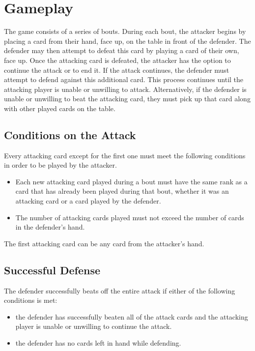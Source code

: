 \section{Gameplay}
The game consists of a series of bouts. During each bout, the attacker begins by placing a card from their hand, face up, on the table in front of the defender. The defender may then attempt to defeat this card by playing a card of their own, face up. Once the attacking card is defeated, the attacker has the option to continue the attack or to end it. If the attack continues, the defender must attempt to defend against this additional card. This process continues until the attacking player is unable or unwilling to attack. Alternatively, if the defender is unable or unwilling to beat the attacking card, they must pick up that card along with other played cards on the table.

\subsection{Conditions on the Attack}
\label{attackconditions}
Every attacking card except for the first one must meet the following conditions in order to be played by the attacker.

\begin{itemize}
    \item Each new attacking card played during a bout must have the same rank as a card that has already been played during that bout, whether it was an attacking card or a card played by the defender.
    \item The number of attacking cards played must not exceed the number of cards in the defender's hand.
\end{itemize}
The first attacking card can be any card from the attacker's hand.

\subsection{Successful Defense}
The defender successfully beats off the entire attack if either of the following conditions is met:
\begin{itemize}
    \item the defender has successfully beaten all of the attack cards and the attacking player is unable or unwilling to continue the attack.
    \item the defender has no cards left in hand while defending.
\end{itemize}

